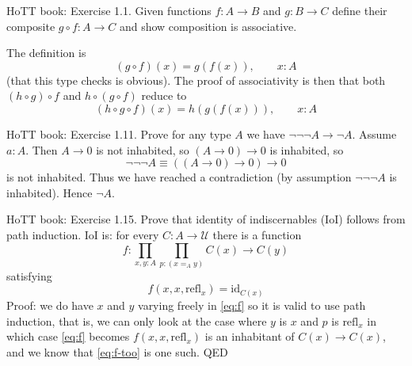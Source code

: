\documentclass[11pt]{article}
\newcommand{\universe}{\mathcal{U}}
\begin{document}
\noindent
HoTT book: Exercise 1.1.  Given functions $f : A \to B$ and $g : B \to C$
define their composite $g \circ f : A \to C$ and show composition is
associative.

\medskip\noindent
The definition is
$$
   (g \circ f)(x) = g(f(x)), \qquad x : A
$$
(that this type checks is obvious).  The proof of associativity is then
that both $(h \circ g) \circ f$ and $h \circ (g \circ f)$ reduce to
$$
   (h \circ g \circ f)(x) = h(g(f(x))), \qquad x : A
$$




\noindent
HoTT book: Exercise 1.11.  Prove for any type $A$ we
have $\neg\neg\neg A \to \neg A$.  Assume $a : A$.
Then $A \to 0$ is not inhabited, so $(A \to 0) \to 0$ is inhabited, so
$$
   \neg\neg\neg A \equiv ((A \to 0) \to 0) \to 0
$$
is not inhabited.  Thus we have reached a contradiction (by assumption
$\neg\neg\neg A$ is inhabited).  Hence $\neg A$.

\medskip\noindent
HoTT book: Exercise 1.15.  Prove that identity of indiscernables (IoI) follows
from path induction.  IoI is: for every $C : A \to \universe$
there is a function
\begin{equation} \label{eq:f}
   f : \prod_{x, y : A} \prod_{p : (x =_A y)} C(x) \to C(y)
\end{equation}
satisfying
\begin{equation} \label{eq:f-too}
   f(x, x, \text{refl}_x) = \text{id}_{C(x)}
\end{equation}
Proof: we do have $x$ and $y$ varying freely in \eqref{eq:f} so it is
valid to use path induction, that is, we can only look at the case where
$y$ is $x$ and $p$ is $\text{refl}_x$ in which case \eqref{eq:f}
becomes $f(x, x, \text{refl}_x)$ is an inhabitant of $C(x) \to C(x)$,
and we know that \eqref{eq:f-too} is one such.  QED
\end{document}
